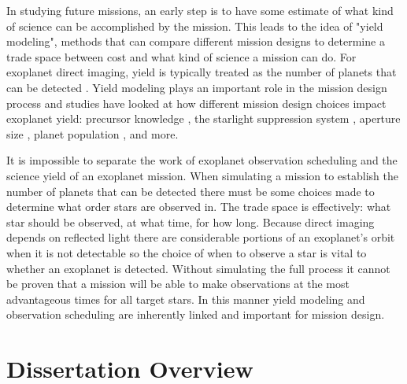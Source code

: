 In studying future missions, an early step is to have some estimate of what
kind of science can be accomplished by the mission. This leads to the idea of
"yield modeling", methods that can compare different mission designs to
determine a trade space between cost and what kind of science a mission can do.
For exoplanet direct imaging, yield is typically treated as the number of
planets that can be detected
\citep{brownSingleVisitPhotometric2005,savranskyAnalyzingDesignsPlanetFinding2010,
starkMaximizingExoEarthCandidate2014}. Yield modeling plays an important role
in the mission design process and studies have looked at how different
mission design choices impact exoplanet yield: precursor knowledge
\citep{morganFasterExoEarth2021}, the starlight suppression system
\citep{savranskyAnalyzingDesignsPlanetFinding2010,morgan19, Stark2016},
aperture size \citep{starkLowerLimitsAperture2015}, planet population
\citep{savranskyComparisonAnalyticalDepth2016}, and more. 

It is impossible to separate the work of exoplanet observation scheduling and
the science yield of an exoplanet mission. When simulating a mission to
establish the number of planets that can be detected there must be some choices
made to determine what order stars are observed in. The trade space is
effectively: what star should be observed, at what time, for how long. Because
direct imaging depends on reflected light there are considerable portions of an
exoplanet's orbit when it is not detectable so the choice of when to observe a
star is vital to whether an exoplanet is detected. Without simulating the full
process it cannot be proven that a mission will be able to make observations at
the most advantageous times for all target stars. In this manner yield modeling
and observation scheduling are inherently linked and important for mission
design.


\section{Dissertation Overview}
\label{sec:dis_overview}

